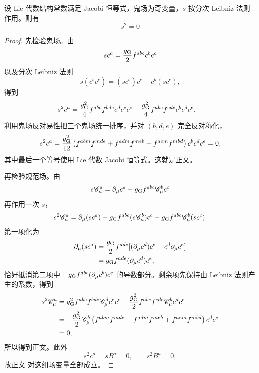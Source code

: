 \begin{proposition}
设 Lie 代数结构常数满足 Jacobi 恒等式，鬼场为奇变量，$s$ 按分次 Leibniz 法则作用。则有
\begin{equation}
 {s^2=0}
\label{eq:brst-nilpotent-dp11}
\end{equation}
\end{proposition}
\begin{proof}
先检验鬼场。由
\begin{equation*}
 sc^a=\frac{g_{\rm G}}2f^{abc}c^bc^c
\end{equation*}
以及分次 Leibniz 法则
\begin{equation*}
 s(c^bc^c)=(sc^b)c^c-c^b(sc^c),
\end{equation*}
得到
\begin{align*}
 s^2c^a
 &=\frac{g_{\rm G}^2}{4}f^{abc}f^{bde}c^dc^ec^c
 -\frac{g_{\rm G}^2}{4}f^{abc}f^{cde}c^bc^dc^e.
\end{align*}
利用鬼场反对易性把三个鬼场统一排序，并对 $(b,d,e)$ 完全反对称化，
\begin{equation*}
 s^2c^a
 =\frac{g_{\rm G}^2}{12}
 \left(
 f^{abm}f^{mde}
 +f^{adm}f^{meb}
 +f^{aem}f^{mbd}
 \right)c^bc^dc^e=0,
\end{equation*}
其中最后一个等号使用 Lie 代数 Jacobi 恒等式。这就是正文。

再检验规范场。由
\begin{equation*}
 s\mathscr C_\mu^a
 =\partial_\mu c^a-g_{\rm G}f^{abc}\mathscr C_\mu^bc^c
\end{equation*}
再作用一次 $s$，
\begin{equation*}
 s^2\mathscr C_\mu^a
 =\partial_\mu(sc^a)
 -g_{\rm G}f^{abc}(s\mathscr C_\mu^b)c^c
 -g_{\rm G}f^{abc}\mathscr C_\mu^b(sc^c).
\end{equation*}
第一项化为
\begin{align*}
 \partial_\mu(sc^a)
 &=\frac{g_{\rm G}}2f^{ade}
 [ (\partial_\mu c^d)c^e+c^d\partial_\mu c^e]\\
 &=g_{\rm G}f^{ade}(\partial_\mu c^d)c^e,
\end{align*}
恰好抵消第二项中
$-g_{\rm G}f^{abc}(\partial_\mu c^b)c^c$ 的导数部分。剩余项先保持由 Leibniz 法则产生的系数，得到
\begin{align*}
 s^2\mathscr C_\mu^a
 &=g_{\rm G}^2f^{abc}f^{bde}\mathscr C_\mu^d c^e c^c
 -\frac{g_{\rm G}^2}{2}f^{abc}f^{cde}\mathscr C_\mu^b c^dc^e\\
 &=-\frac{g_{\rm G}^2}{2}\mathscr C_\mu^b
 \left(
 f^{abm}f^{mde}
 +f^{adm}f^{meb}
 +f^{aem}f^{mbd}
 \right)c^dc^e\\
 &=0,
\end{align*}
所以得到正文。此外
\begin{equation*}
 s^2\bar c^a=sB^a=0,
 \qquad
 s^2B^a=0,
\end{equation*}
故正文 对这组场变量全部成立。
\end{proof}

